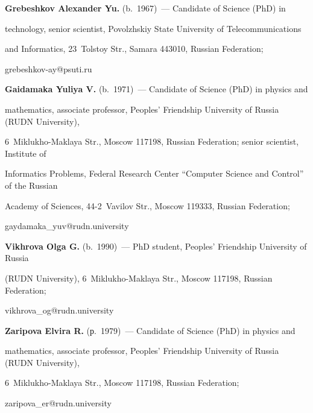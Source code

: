 \textbf{Grebeshkov Alexander Yu.} (b.\ 1967)~--- Candidate of Science (PhD) in 


technology, senior scientist, Povolzhskiy State University of Telecommunications 


and Informatics, 23~Tolstoy Str., Samara 443010, Russian Federation;  


\mbox{grebeshkov-ay@psuti.ru}





\vspace*{3pt}





\noindent


\textbf{Gaidamaka Yuliya V.} (b.\ 1971)~--- Candidate of Science (PhD) in physics and 


mathematics, associate professor, Peoples' Friendship University of Russia (RUDN University), 


6~Miklukho-Maklaya Str., Moscow 117198, Russian Federation; senior scientist, Institute of 


Informatics Problems, Federal Research Center ``Computer Science and Control'' of the Russian 


Academy of Sciences, 44-2~Vavilov Str., Moscow 119333, Russian Federation; 


\mbox{gaydamaka\_yuv@rudn.university}





\vspace*{3pt}





\noindent


\textbf{Vikhrova Olga G.} (b.\ 1990)~--- PhD student, Peoples' Friendship University of Russia 


(RUDN University), 6~Miklukho-Maklaya Str., Moscow 117198, Russian Federation; 


\mbox{vikhrova\_og@rudn.university}





\vspace*{3pt}





\noindent


\textbf{Zaripova Elvira R.} (р.\ 1979)~--- Candidate of Science (PhD) in physics and 


mathematics, associate professor, Peoples' Friendship University of Russia (RUDN University), 


6~Miklukho-Maklaya Str., Moscow 117198, Russian Federation; 


\mbox{zaripova\_er@rudn.university}





\label{end\stat}








\renewcommand{\bibname}{\protect\rm Литература} 



